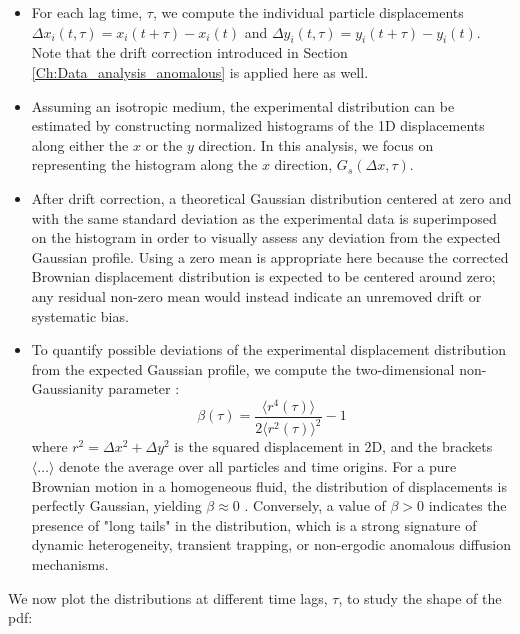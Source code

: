 \begin{itemize}
    \item For each lag time, $\tau$, we compute the individual particle displacements $\Delta x_i(t,\tau) = x_i(t + \tau) - x_i(t)$ and $\Delta y_i(t,\tau) = y_i(t + \tau) - y_i(t)$. Note that the drift correction introduced in Section \ref{Ch:Data_analysis_anomalous} is applied here as well.
    \item Assuming an isotropic medium, the experimental distribution can be estimated by constructing normalized histograms of the 1D displacements along either the $x$ or the $y$ direction. In this analysis, we focus on representing the histogram along the $x$ direction, $G_s(\Delta x,\tau)$.
    \item After drift correction, a theoretical Gaussian distribution centered at zero and with the same standard deviation as the experimental data is superimposed on the histogram in order to visually assess any deviation from the expected Gaussian profile. Using a zero mean is appropriate here because the corrected Brownian displacement distribution is expected to be centered around zero; any residual non-zero mean would instead indicate an unremoved drift or systematic bias.
    \item To quantify possible deviations of the experimental displacement distribution from the expected Gaussian profile, we compute the two-dimensional non-Gaussianity parameter \cite{C4CP03465A}:
    \begin{equation*}
        \beta(\tau) = \frac{\langle r^4(\tau) \rangle}{2\langle r^2(\tau) \rangle^2} - 1
    \end{equation*}
    where $r^2 = \Delta x^2 + \Delta y^2$ is the squared displacement in 2D, and the brackets $\langle \dots \rangle$ denote the average over all particles and time origins. For a pure Brownian motion in a homogeneous fluid, the distribution of displacements is perfectly Gaussian, yielding $\beta \approx 0$ \cite{C4CP03465A}. Conversely, a value of $\beta > 0$ indicates the presence of "long tails" in the distribution, which is a strong signature of dynamic heterogeneity, transient trapping, or non-ergodic anomalous diffusion mechanisms.
\end{itemize}

We now plot the distributions at different time lags, $\tau$, to study the shape of the pdf:

